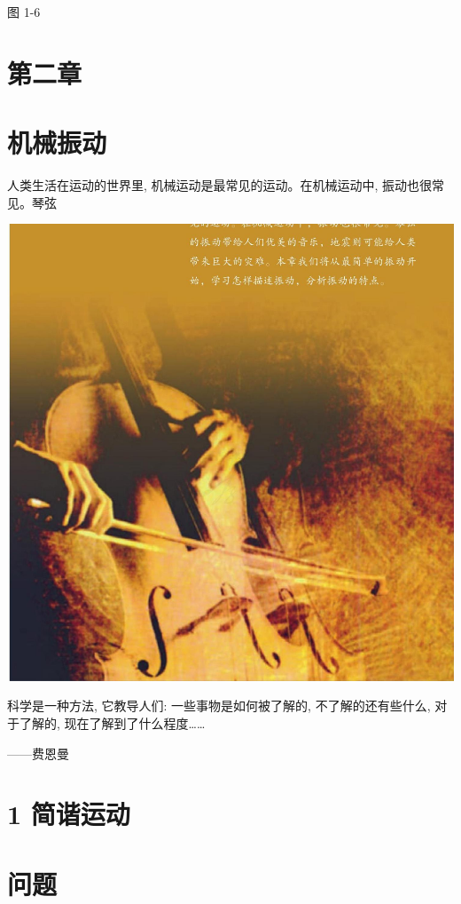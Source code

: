 \documentclass[10pt]{article}
\begin{document}
图 1-6

\section*{第二章}

\section*{机械振动}

人类生活在运动的世界里, 机械运动是最常见的运动。在机械运动中, 振动也很常见。琴弦

\begin{center}
\includegraphics[max width=1.0\textwidth]{images/01910e4c-ebb8-7d2c-8f2f-2375bc1d2d12_36_741348.jpg}
\end{center}

科学是一种方法, 它教导人们: 一些事物是如何被了解的, 不了解的还有些什么, 对于了解的, 现在了解到了什么程度……

——费恩曼

\section*{1 简谐运动}

\section*{问题}
\end{document}
